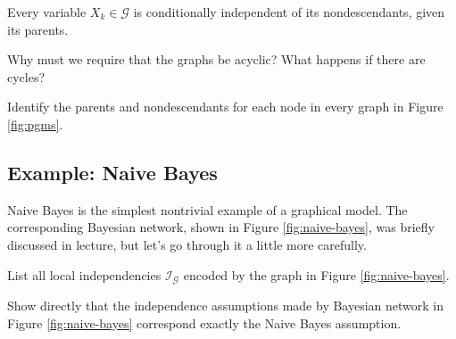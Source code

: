 \documentclass{discussion}
\newcommand{\G}{\mathcal{G}}
\newcommand{\I}{\mathcal{I}}
\begin{document}
\begin{framed} \centering
Every variable $X_k \in \G$ is conditionally independent of its nondescendants, given its parents.
\end{framed}

\begin{exercise}
Why must we require that the graphs be acyclic?  What happens if there are cycles?
\end{exercise}

\begin{exercise}
Identify the parents and nondescendants for each node in every graph in Figure \ref{fig:pgms}.
\end{exercise}

\subsection{Example: Naive Bayes}

Naive Bayes is the simplest nontrivial example of a graphical model.  The corresponding Bayesian network, shown in Figure \ref{fig:naive-bayes}, was briefly discussed in lecture, but let's go through it a little more carefully.

\begin{exercise}
List all local independencies $\I_\G$ encoded by the graph in Figure \ref{fig:naive-bayes}.
\end{exercise}

\begin{example}
Show directly that the independence assumptions made by Bayesian network in Figure \ref{fig:naive-bayes} correspond exactly the Naive Bayes assumption.
\end{example}
\end{document}
